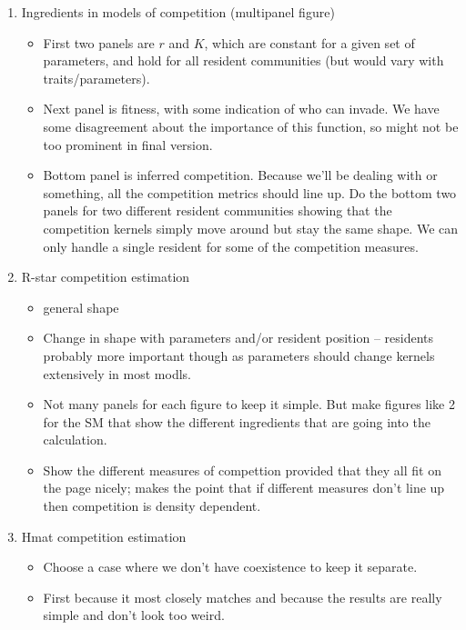\documentclass[a4paper,11pt]{article}
\begin{document}
\begin{enumerate}
\item Ingredients in models of competition (multipanel figure)
  \begin{itemize}
  \item First two panels are $r$ and $K$, which are constant for a
    given set of parameters, and hold for all resident communities
    (but would vary with traits/parameters).
  \item Next panel is fitness, with some indication of who can
    invade.  We have some disagreement about the importance of this
    function, so might not be too prominent in final version.
  \item Bottom panel is inferred competition.  Because we'll be
    dealing with \citet{Dieckmann-1999} or something, all the
    competition metrics should line up.  Do the bottom two panels for
    two different resident communities showing that the competition
    kernels simply move around but stay the same shape.  We can only
    handle a single resident for some of the competition measures.
  \end{itemize}
\item R-star competition estimation
  \begin{itemize}
  \item general shape
  \item Change in shape with parameters and/or resident position --
    residents probably more important though as parameters should
    change kernels extensively in most modls.
  \item Not many panels for each figure to keep it simple.  But make
    figures like 2 for the SM that show the different ingredients that
    are going into the calculation.
  \item Show the different measures of compettion provided that they
    all fit on the page nicely; \citet{Abrams-2008} makes the point
    that if different measures don't line up then competition is
    density dependent.
  \end{itemize}
\item Hmat competition estimation
  \begin{itemize}
  \item Choose a case where we don't have coexistence to keep it
    separate.
  \item First because it most closely matches \citet{Kisdi-1999} and
    because the results are really simple and don't look too weird.
  \end{itemize}

\end{enumerate}
\end{document}
